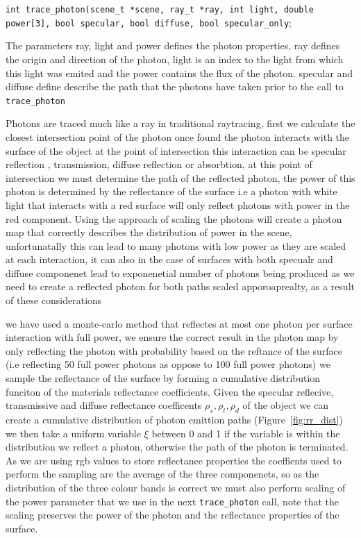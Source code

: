 \texttt{int trace\_photon(scene\_t *scene, ray\_t *ray, int light, double power[3], bool specular, bool diffuse, bool specular\_only};

The parameters ray, light and power defines the photon properties, ray defines the origin and direction of the photon, light is an index
to the light from which this light was emited and the power contains the flux of the photon. specular and diffuse
define describe the path that the photons have taken prior to the call to \texttt{trace\_photon}

Photons are traced much like a ray in traditional raytracing, first we calculate the closest intersection point of the photon
once found the photon interacts with the surface of the object at the point of intersection this interaction can be specular 
reflection , transmission, diffuse reflection or absorbtion, at this point of intersection we must determine the path of the reflected
photon, the power of this photon is determined by the reflectance of the surface i.e a photon with white light that interacts with
a red surface will only reflect photons with power in the red component. Using the approach of scaling the photons will create a photon
map that correctly describes the distribution of power in the scene, unfortunatally this can lead to many photons with low power as they
are scaled at each interaction, it can also in the case of surfaces with both specualr and diffuse componenet lead to exponenetial number
of photons being produced as we need to create a reflected photon for both paths scaled apporoaprealty, as a result of these considerations

we have used a monte-carlo method that reflectes at most one photon
per surface interaction with full power, we ensure the correct result in the photon map by only reflecting the photon
with probability based on the reftance of the surface (i.e reflecting 50 full power photons as oppose to 100 full power photons)
we sample the reflectance of the surface by forming a cumulative distribution funciton of the materials reflectance coefficients.
Given the specular reflecive, transmissive and diffuse reflectance coefficents $\rho_{s}, \rho_{t}, \rho_{d}$
of the object we can create a cumulative distribution of photon emittion paths (Figure~\ref{fig:rr_dist}) 
we then take a uniform variable $\xi$ between 0 and 1 if the variable is within the distribution we reflect a photon, otherwise
the path of the photon is terminated. As we are using rgb values to store reflectance properties the
coeffients used to perform the sampling are the average of the three componenets, so as the distribution of the three
colour bands is correct we must also perform scaling of the power parameter that we use in the next \texttt{trace\_photon}
call, note that the scaling preserves the power of the photon and the reflectance properties of the surface.

